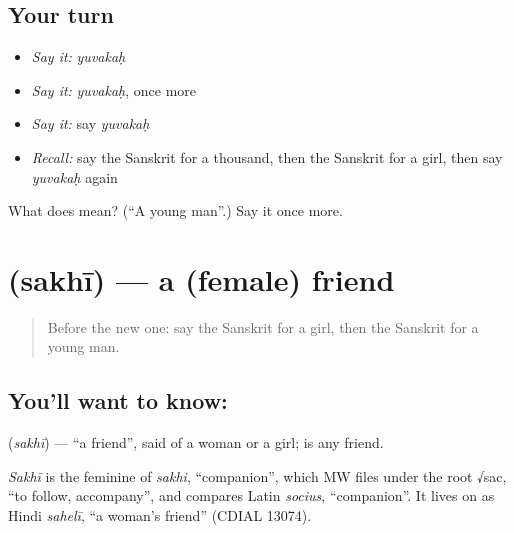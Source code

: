 \subsection*{Your turn}
\begin{itemize}
\raggedright
  \item \emph{Say it:} \emph{yuvakaḥ}
  \item \emph{Say it:} \emph{yuvakaḥ}, once more
  \item \emph{Say it:} say \emph{yuvakaḥ}
  \item \emph{Recall:} say the Sanskrit for a thousand, then the Sanskrit for a girl, then say \emph{yuvakaḥ} again
\end{itemize}

\begin{tcolorbox}[breakable,colback=teal!4,colframe=teal!35!black,title={Before you move on}]
What does  mean? (\textquotedblleft{}A young man\textquotedblright{}.) Say it once more.
\end{tcolorbox}
\section[\texorpdfstring{\sk{सखी} (sakhī)}{सखी (sakhī)}]{ (sakhī) — a (female) friend}

\label{lesson:SA-C88-friend}



\begin{quote}
Before the new one: say the Sanskrit for a girl, then the Sanskrit for a young man.
\end{quote}

\subsection*{You'll want to know: }
\textbf{} (\emph{sakhī}) — \textquotedblleft{}a friend\textquotedblright{}, said of a woman or a girl; \textbf{} is any friend.

\begin{cousinweb}
\emph{Sakhī} is the feminine of \emph{sakhi}, \textquotedblleft{}companion\textquotedblright{}, which MW files under the root √sac, \textquotedblleft{}to follow, accompany\textquotedblright{}, and compares Latin \emph{socius}, \textquotedblleft{}companion\textquotedblright{}. It lives on as Hindi \emph{sahelī}, \textquotedblleft{}a woman's friend\textquotedblright{} (CDIAL 13074).
\end{cousinweb}

